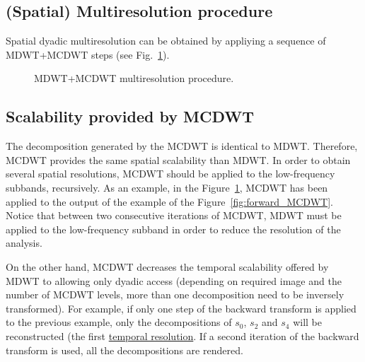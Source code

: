 \subsection{(Spatial) Multiresolution procedure}

Spatial dyadic multiresolution can be obtained by appliying a sequence of MDWT+MCDWT steps (see Fig.~\ref{fig:multiresolution}).

\begin{figure}
\centering
{}
\caption{MDWT+MCDWT multiresolution procedure.\label{fig:multiresolution}}
\end{figure}


\subsection{Scalability provided by MCDWT}
The decomposition generated by the MCDWT is identical to
MDWT. Therefore, MCDWT provides the same spatial scalability than
MDWT. In order to obtain several spatial resolutions, MCDWT should be
applied to the low-frequency subbands, recursively. As an example, in
the Figure~\ref{fig:multiresolution}, MCDWT has been applied to the
output of the example of the Figure~\ref{fig:forward_MCDWT}. Notice
that between two consecutive iterations of MCDWT, MDWT must be applied
to the low-frequency subband in order to reduce the resolution of the
analysis.

On the other hand, MCDWT decreases the temporal scalability offered by
MDWT to allowing only dyadic access (depending on required image and
the number of MCDWT levels, more than one decomposition need to be
inversely transformed). For example, if only one step of the backward
transform is applied to the previous example, only the decompositions
of $s_0$, $s_2$ and $s_4$ will be reconstructed (the first
\href{https://en.wikipedia.org/wiki/Temporal_resolution}{temporal
  resolution}. If a second iteration of the backward transform is
used, all the decompositions are rendered.

